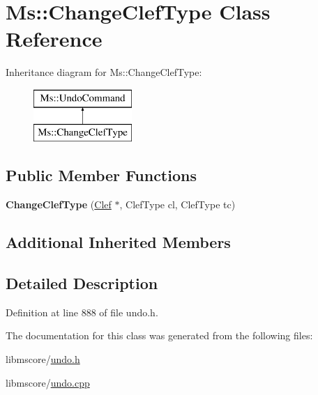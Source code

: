 \hypertarget{class_ms_1_1_change_clef_type}{}\section{Ms\+:\+:Change\+Clef\+Type Class Reference}
\label{class_ms_1_1_change_clef_type}
Inheritance diagram for Ms\+:\+:Change\+Clef\+Type\+:\begin{figure}[H]
\begin{center}
\leavevmode
\includegraphics[height=2.000000cm]{class_ms_1_1_change_clef_type}
\end{center}
\end{figure}
\subsection*{Public Member Functions}
\begin{DoxyCompactItemize}
\item 
\mbox{\label{class_ms_1_1_change_clef_type_ae82c2751dabf0c1305a31b8a4d4cef70}} 
{\bfseries Change\+Clef\+Type} (\hyperlink{class_ms_1_1_clef}{Clef} $\ast$, Clef\+Type cl, Clef\+Type tc)
\end{DoxyCompactItemize}
\subsection*{Additional Inherited Members}


\subsection{Detailed Description}


Definition at line 888 of file undo.\+h.



The documentation for this class was generated from the following files\+:\begin{DoxyCompactItemize}
\item 
libmscore/\hyperlink{undo_8h}{undo.\+h}\item 
libmscore/\hyperlink{undo_8cpp}{undo.\+cpp}\end{DoxyCompactItemize}

